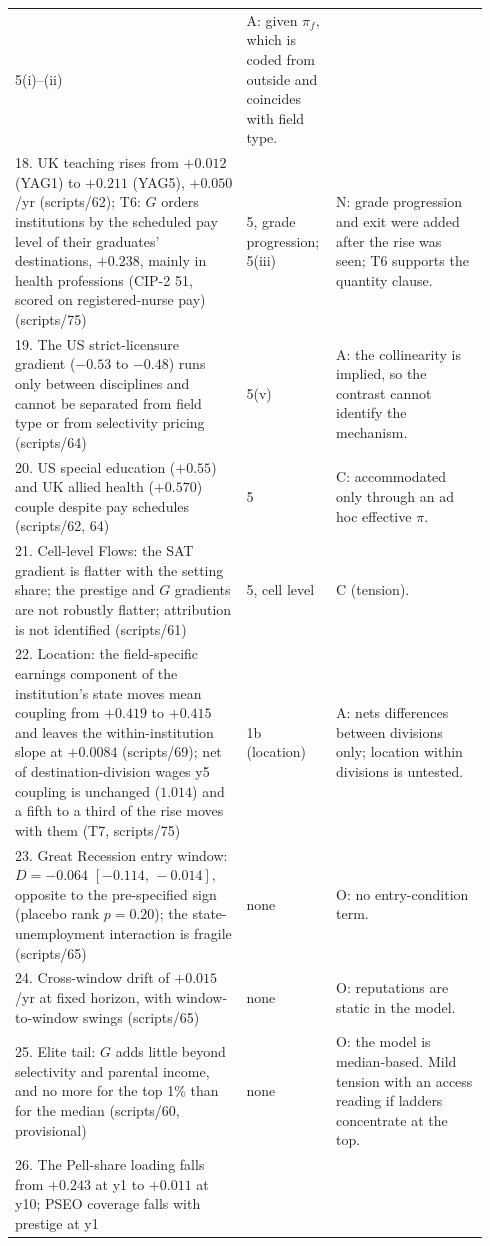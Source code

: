 \documentclass[11pt]{article}
\newcommand{\ci}[2]{$[#1,\allowbreak\,#2]$}
\begin{document}
{\begin{longtable}{@{}p{0.47\linewidth}p{0.16\linewidth}p{0.31\linewidth}@{}}
5(i)--(ii) & A: given $\pi_f$, which is coded from outside and coincides with field type.\\
18. UK teaching rises from $+0.012$ (YAG1) to $+0.211$ (YAG5), $+0.050$/yr (scripts/62); T6: $G$ orders institutions by the scheduled pay level of their graduates'
destinations, $+0.238$, mainly in health professions (CIP-2 51, scored on registered-nurse pay) (scripts/75) & 5, grade progression; 5(iii) & N: grade progression and exit
were added after the rise was seen; T6 supports the quantity clause.\\
19. The US strict-licensure gradient ($-0.53$ to $-0.48$) runs only between disciplines and cannot be separated from
field type or from selectivity pricing (scripts/64) & 5(v) & A: the collinearity is implied, so the contrast cannot
identify the mechanism.\\
20. US special education ($+0.55$) and UK allied health ($+0.570$) couple despite pay schedules (scripts/62, 64) &
5 & C: accommodated only through an ad hoc effective $\pi$.\\
21. Cell-level Flows: the SAT gradient is flatter with the setting share; the prestige and $G$ gradients are not
robustly flatter; attribution is not identified (scripts/61) & 5, cell level & C (tension).\\
22. Location: the field-specific earnings component of the institution's state moves mean coupling from $+0.419$
to $+0.415$ and leaves the within-institution slope at $+0.0084$ (scripts/69); net of destination-division wages
y5 coupling is unchanged ($1.014$) and a fifth to a third of the rise moves with them (T7, scripts/75) & 1b
(location) & A: nets differences between divisions only; location within divisions is untested.\\
23. Great Recession entry window: $D=-0.064$ \ci{-0.114}{-0.014}, opposite to the pre-specified sign (placebo rank
$p=0.20$); the state-unemployment interaction is fragile (scripts/65) & none & O: no entry-condition term.\\
24. Cross-window drift of $+0.015$/yr at fixed horizon, with window-to-window swings (scripts/65) & none & O:
reputations are static in the model.\\
25. Elite tail: $G$ adds little beyond selectivity and parental income, and no more for the top 1\% than for the
median (scripts/60, provisional) & none & O: the model is median-based. Mild tension with an access reading if
ladders concentrate at the top.\\
26. The Pell-share loading falls from $+0.243$ at y1 to $+0.011$ at y10; PSEO coverage falls with prestige at y1

\end{longtable}}
\end{document}
